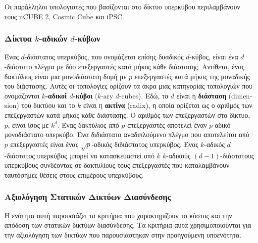 \documentclass[12pt,a4paper]{article}
\begin{document}
Οι παράλληλοι υπολογιστές που βασίζονται στο δίκτυο υπερκύβου περιλαμβάνουν 
τους \foreignlanguage{english}{nCUBE 2, Cosmic Cube} και 
\foreignlanguage{english}{iPSC}.

\subsubsection*{Δίκτυα $k$-αδικών $d$-κύβων}
Ένας $d$-διάστατος υπερκύβος, που ονομάζεται επίσης δυαδικός $d$-κύβος, 
είναι ένα $d$-διάστατο πλέγμα με δύο επεξεργαστές κατά μήκος κάθε διάστασης. 
Αντίθετα, ένας δακτύλιος είναι μια μονοδιάστατη δομή με $p$ επεξεργαστές 
κατά μήκος της μοναδικής του διάστασης. Αυτές οι τοπολογίες ορίζουν τα 
άκρα μιας κατηγορίας τοπολογιών που ονομάζονται \textbf{$k$-αδικοί $d$-κύβοι} 
(\foreignlanguage{english}{$k$-ary $d$-cubes}). Εδώ, το $d$ είναι η 
\textbf{διάσταση} (\foreignlanguage{english}{dimension}) του δικτύου και 
το $k$ είναι η \textbf{ακτίνα} (\foreignlanguage{english}{radix}), η οποία 
ορίζεται ως ο αριθμός των επεξεργαστών κατά μήκος κάθε διάστασης. Ο αριθμός 
των επεξεργαστών στο δίκτυο, $p$, είναι ίσος με $k^d$. Ένας δακτύλιος από 
$p$ επεξεργαστές αποτελεί έναν $p$-αδικό μονοδιάστατο υπερκύβο. Ένα 
διδιάστατο αναδιπλούμενο πλέγμα που αποτελείται από $p$ επεξεργαστές είναι 
ένας $\sqrt{p}$-αδικός διδιάστατος υπερκύβος. Ένας $k$-αδικός $d$-διάστατος 
υπερκύβος μπορεί να κατασκευαστεί από $k$ $k$-αδικούς $(d-1)$-διάστατους 
υπερκύβους συνδέοντας σε δακτυλίους τους επεξεργαστές που καταλαμβάνουν
ταυτόσημες θέσεις στους επιμέρους υπερκύβους.

\subsubsection{Αξιολόγηση Στατικών Δικτύων Διασύνδεσης}
Η ενότητα αυτή παρουσιάζει τα κριτήρια που χαρακτηρίζουν το κόστος και την 
απόδοση των στατικών δικτύων διασύνδεσης. Τα κριτήρια αυτά χρησιμοποιούνται 
για την αξιολόγηση των δικτύων που παρουσιάστηκαν στην προηγούμενη υποενότητα.
\end{document}

